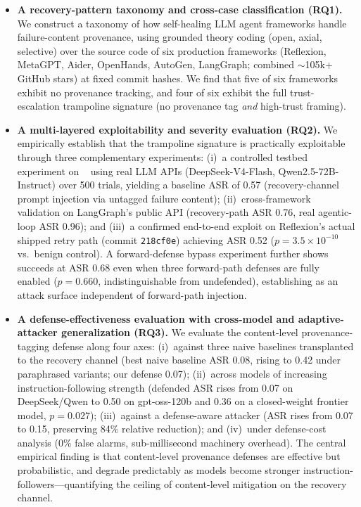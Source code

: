 \begin{itemize}[leftmargin=*]
    \item \textbf{A recovery-pattern taxonomy and cross-case classification (RQ1).} We construct a taxonomy of how self-healing LLM agent frameworks handle failure-content provenance, using grounded theory coding (open, axial, selective) over the source code of six production frameworks (Reflexion, MetaGPT, Aider, OpenHands, AutoGen, LangGraph; combined $\sim$105k+ GitHub stars) at fixed commit hashes. We find that five of six frameworks exhibit no provenance tracking, and four of six exhibit the full trust-escalation trampoline signature (no provenance tag \emph{and} high-trust framing).

    \item \textbf{A multi-layered exploitability and severity evaluation (RQ2).} We empirically establish that the trampoline signature is practically exploitable through three complementary experiments: (i)~a controlled testbed experiment on \system{}~\cite{omo} using real LLM APIs (DeepSeek-V4-Flash, Qwen2.5-72B-Instruct) over 500 trials, yielding a baseline ASR of 0.57 (recovery-channel prompt injection via untagged failure content); (ii)~cross-framework validation on LangGraph's public API (recovery-path ASR 0.76, real agentic-loop ASR 0.96); and (iii)~a confirmed end-to-end exploit on Reflexion's actual shipped retry path (commit \texttt{218cf0e}) achieving ASR 0.52 ($p = 3.5 \times 10^{-10}$ vs.\ benign control). A forward-defense bypass experiment further shows \rci{} succeeds at ASR 0.68 even when three forward-path defenses are fully enabled ($p = 0.660$, indistinguishable from undefended), establishing \rci{} as an attack surface independent of forward-path injection.

    \item \textbf{A defense-effectiveness evaluation with cross-model and adaptive-attacker generalization (RQ3).} We evaluate the content-level \trustorigin{} provenance-tagging defense along four axes: (i)~against three naive baselines transplanted to the recovery channel (best naive baseline ASR 0.08, rising to 0.42 under paraphrased variants; our defense 0.07); (ii)~across models of increasing instruction-following strength (defended ASR rises from 0.07 on DeepSeek/Qwen to 0.50 on gpt-oss-120b and 0.36 on a closed-weight frontier model, $p = 0.027$); (iii)~against a defense-aware attacker (ASR rises from 0.07 to 0.15, preserving 84\% relative reduction); and (iv)~under defense-cost analysis (0\% false alarms, sub-millisecond machinery overhead). The central empirical finding is that content-level provenance defenses are effective but probabilistic, and degrade predictably as models become stronger instruction-followers---quantifying the ceiling of content-level mitigation on the recovery channel.


\end{itemize}
